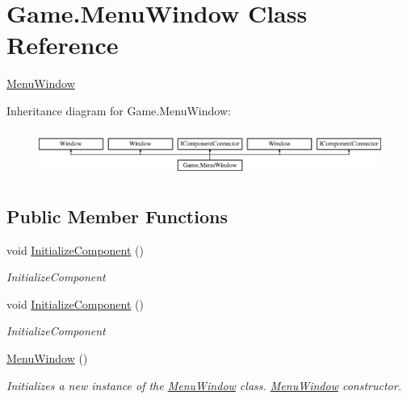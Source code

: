 \hypertarget{class_game_1_1_menu_window}{}\section{Game.\+Menu\+Window Class Reference}
\label{class_game_1_1_menu_window}


\mbox{\hyperlink{class_game_1_1_menu_window}{Menu\+Window}}  


Inheritance diagram for Game.\+Menu\+Window\+:\begin{figure}[H]
\begin{center}
\leavevmode
\includegraphics[height=1.544828cm]{class_game_1_1_menu_window}
\end{center}
\end{figure}
\subsection*{Public Member Functions}
\begin{DoxyCompactItemize}
\item 
void \mbox{\hyperlink{class_game_1_1_menu_window_a22610c5f8a989abc6d3518b498acf3b4}{Initialize\+Component}} ()
\begin{DoxyCompactList}\small\item\em Initialize\+Component \end{DoxyCompactList}\item 
void \mbox{\hyperlink{class_game_1_1_menu_window_a22610c5f8a989abc6d3518b498acf3b4}{Initialize\+Component}} ()
\begin{DoxyCompactList}\small\item\em Initialize\+Component \end{DoxyCompactList}\item 
\mbox{\hyperlink{class_game_1_1_menu_window_aea0aa3ab11dc0d9baf4fc47c6088c13a}{Menu\+Window}} ()
\begin{DoxyCompactList}\small\item\em Initializes a new instance of the \mbox{\hyperlink{class_game_1_1_menu_window}{Menu\+Window}} class. \mbox{\hyperlink{class_game_1_1_menu_window}{Menu\+Window}} constructor. \end{DoxyCompactList}\end{DoxyCompactItemize}


